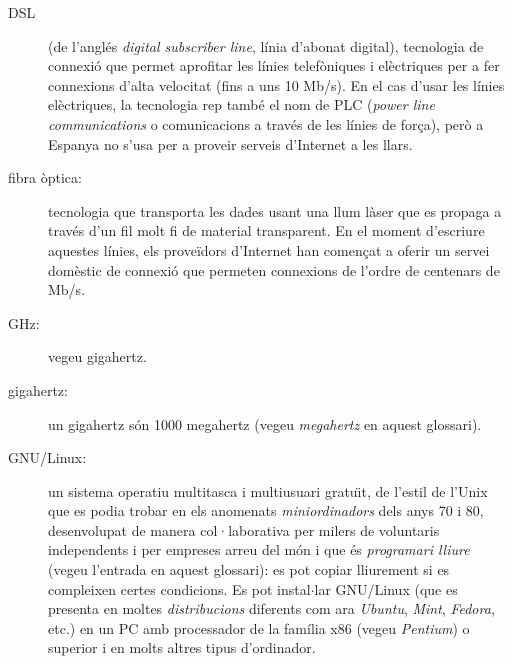 \begin{description}
  
\item[DSL] (de l'anglés \emph{digital subscriber line}, línia d'abonat
  digital), tecnologia de connexió que permet aprofitar les línies
  telefòniques i elèctriques per a fer connexions d'alta velocitat
  (fins a uns 10 Mb/s). En el cas d'usar les línies elèctriques, la
  tecnologia rep també el nom de PLC (\emph{power line communications}
  o comunicacions a través de les línies de força), però a Espanya no
  s'usa per a proveir serveis d'Internet a les llars.

\item[fibra òptica:] tecnologia que transporta les dades usant una
  llum làser que es propaga a través d'un fil molt fi de material
  transparent. En el moment d'escriure aquestes línies, els proveïdors
  d'Internet han començat a oferir un servei domèstic de connexió que
  permeten connexions de l'ordre de centenars de Mb/s.

\item[GHz:] vegeu gigahertz.

\item[gigahertz:] un gigahertz són 1000 megahertz (vegeu
  \emph{megahertz} en aquest glossari).
  
\item[GNU/Linux:] un sistema operatiu multitasca i multiusuari
  gratu\"{\i}t, de l'estil de l'Unix que es podia trobar en els
  anomenats \emph{miniordinadors} dels anys 70 i 80, desenvolupat de
  manera col·laborativa per milers de voluntaris independents i per
  empreses arreu del món i que és \emph{programari lliure} (vegeu
  l'entrada en aquest glossari): es pot copiar lliurement si es
  compleixen certes condicions. Es pot instal$\cdot$lar GNU/Linux (que
  es presenta en moltes \emph{distribucions} diferents com ara
  \emph{Ubuntu}, \emph{Mint}, \emph{Fedora}, etc.) en un PC amb
  processador de la família x86 (vegeu \emph{Pentium}) o superior i en
  molts altres tipus d'ordinador.
  

\end{description}
